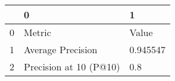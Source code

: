 \begin{tabular}{lll}
\toprule
{} &                       0 &         1 \\
\midrule
0 &                  Metric &     Value \\
1 &       Average Precision &  0.945547 \\
2 &  Precision at 10 (P@10) &       0.8 \\
\bottomrule
\end{tabular}
